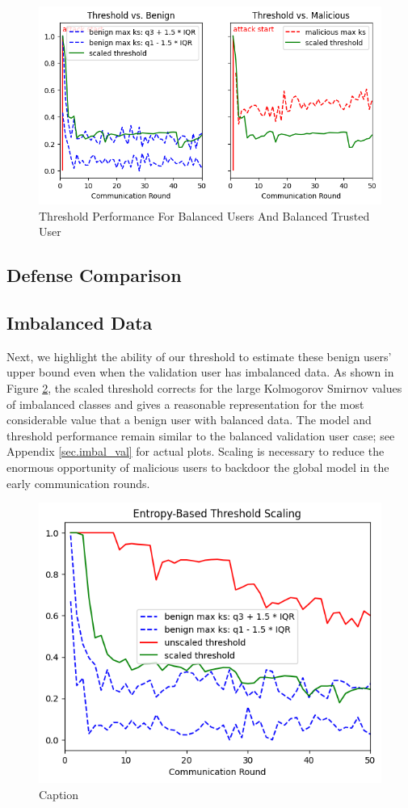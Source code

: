 \documentclass{article} %
\begin{document}
\begin{figure}[H]
    \centering
    \includegraphics[width=.75\textwidth]{01_trusted/centralized/alpha10000--alpha_val10000/visuals/threshold--n_malicious1--m_start1--d_rounds50.png}
    \caption{Threshold Performance For Balanced Users And Balanced Trusted User}
    \label{fig:centralized--alpha10000--alpha_val10000--threshold--n_malicious1--m_start1--d_rounds50}
\end{figure}

\subsection{Defense Comparison}

\subsection{Imbalanced Data}

Next, we highlight the ability of our threshold to estimate these benign users' upper bound even when the validation user has imbalanced data. As shown in Figure \ref{fig:centralized--alpha10000--alpha_val1--scaling--d_rounds50.png}, the scaled threshold corrects for the large Kolmogorov Smirnov values of imbalanced classes and gives a reasonable representation for the most considerable value that a benign user with balanced data. The model and threshold performance remain similar to the balanced validation user case; see Appendix \ref{sec.imbal_val} for actual plots. Scaling is necessary to reduce the enormous opportunity of malicious users to backdoor the global model in the early communication rounds.

\begin{figure}[H]
    \centering
    \includegraphics[width=.5\textwidth]{01_trusted/centralized/alpha10000--alpha_val1/visuals/scaling--n_malicious1--m_start1--d_rounds50.png}
    \caption{Caption}
    \label{fig:centralized--alpha10000--alpha_val1--scaling--d_rounds50.png}
\end{figure}
\end{document}
